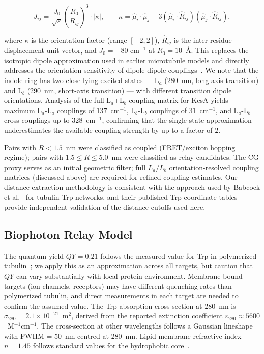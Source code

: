 \documentclass[aps,pre,twocolumn,showpacs,superscriptaddress]{revtex4-2}
\begin{document}
\[
J_{ij} = \frac{J_0}{\sqrt{\varepsilon}} \left(\frac{R_0}{R_{ij}}\right)^3 \cdot |\kappa|,
\qquad
\kappa = \hat{\mu}_i \cdot \hat{\mu}_j - 3(\hat{\mu}_i \cdot \hat{R}_{ij})(\hat{\mu}_j \cdot \hat{R}_{ij}),
\]

where $\kappa$ is the orientation factor (range $[-2, 2]$), $\hat{R}_{ij}$ is the inter-residue displacement unit vector, and $J_0 = -80$ cm$^{-1}$ at $R_0 = 10$~\AA. This replaces the isotropic dipole approximation used in earlier microtubule models and directly addresses the orientation sensitivity of dipole-dipole couplings~\cite{Valeur2012}. We note that the indole ring has two close-lying excited states --- L$_a$ (280~nm, long-axis transition) and L$_b$ (290~nm, short-axis transition) --- with different transition dipole orientations. Analysis of the full L$_a$+L$_b$ coupling matrix for KcsA yields maximum L$_a$-L$_a$ couplings of $137$~cm$^{-1}$, L$_b$-L$_b$ couplings of $31$~cm$^{-1}$, and L$_a$-L$_b$ cross-couplings up to $328$~cm$^{-1}$, confirming that the single-state approximation underestimates the available coupling strength by up to a factor of $2$.

Pairs with $R < 1.5$~nm were classified as coupled (FRET/exciton hopping regime); pairs with $1.5 \leq R \leq 5.0$~nm were classified as relay candidates. The CG proxy serves as an initial geometric filter; full $L_a/L_b$ orientation-resolved coupling matrices (discussed above) are required for refined coupling estimates. Our distance extraction methodology is consistent with the approach used by Babcock et al.~\cite{Babcock2024} for tubulin Trp networks, and their published Trp coordinate tables provide independent validation of the distance cutoffs used here.

\subsection{Biophoton Relay Model}

The quantum yield $QY = 0.21$ follows the measured value for Trp in polymerized tubulin~\cite{Babcock2024}; we apply this as an approximation across all targets, but caution that $QY$ can vary substantially with local protein environment. Membrane-bound targets (ion channels, receptors) may have different quenching rates than polymerized tubulin, and direct measurements in each target are needed to confirm the assumed value. The Trp absorption cross-section at 280~nm is $\sigma_{280} = 2.1\times10^{-21}$~m$^2$, derived from the reported extinction coefficient $\varepsilon_{280} \approx 5600$~M$^{-1}$cm$^{-1}$. The cross-section at other wavelengths follows a Gaussian lineshape with FWHM = 50~nm centred at 280~nm. Lipid membrane refractive index $n = 1.45$ follows standard values for the hydrophobic core~\cite{vanMeer2008}.
\end{document}
